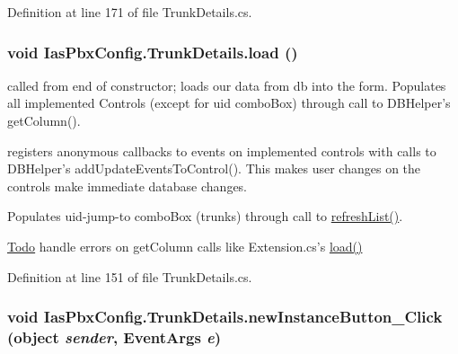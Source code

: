 Definition at line 171 of file TrunkDetails.cs.\hypertarget{class_ias_pbx_config_1_1_trunk_details_a2dd1283dc843a19b6d5cc13e957c322b}{
\subsubsection[{load}]{\setlength{\rightskip}{0pt plus 5cm}void IasPbxConfig.TrunkDetails.load ()}}
\label{class_ias_pbx_config_1_1_trunk_details_a2dd1283dc843a19b6d5cc13e957c322b}


called from end of constructor; loads our data from db into the form. Populates all implemented Controls (except for uid comboBox) through call to DBHelper's getColumn().

registers anonymous callbacks to events on implemented controls with calls to DBHelper's addUpdateEventsToControl(). This makes user changes on the controls make immediate database changes.

Populates uid-\/jump-\/to comboBox (trunks) through call to \hyperlink{class_ias_pbx_config_1_1_trunk_details_a043ccba78a5c1bde053f3f7e23502b33}{refreshList()}.

\begin{Desc}
\item[\hyperlink{todo__todo000044}{Todo}]handle errors on getColumn calls like Extension.cs's \hyperlink{class_ias_pbx_config_1_1_trunk_details_a2dd1283dc843a19b6d5cc13e957c322b}{load()} \end{Desc}


Definition at line 151 of file TrunkDetails.cs.\hypertarget{class_ias_pbx_config_1_1_trunk_details_a63675d1136bcddb728c7907a1a065ead}{
\subsubsection[{newInstanceButton\_\-Click}]{\setlength{\rightskip}{0pt plus 5cm}void IasPbxConfig.TrunkDetails.newInstanceButton\_\-Click (object {\em sender}, \/  EventArgs {\em e})}}
\label{class_ias_pbx_config_1_1_trunk_details_a63675d1136bcddb728c7907a1a065ead}


